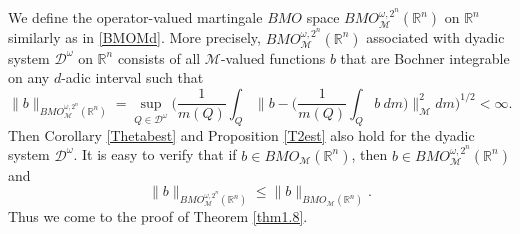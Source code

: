 \documentclass[oneside,english,a4wide]{amsart}
\numberwithin{equation}{section}
\numberwithin{figure}{section}
\theoremstyle{plain}
\theoremstyle{plain}
\theoremstyle{definition}
\theoremstyle{plain}
\theoremstyle{remark}
\theoremstyle{definition}
\theoremstyle{remark}
\theoremstyle{definition}
\newcommand{\M}{{\mathcal M}}
\newcommand{\8}{\infty}
\begin{document}
We define the operator-valued martingale $BMO$ space $BMO^{\omega, 2^n}_\M(\mathbb{R}^n)$ on $\mathbb{R}^n$ similarly as in \eqref{BMOMd}. More precisely, $BMO^{\omega, 2^n}_\M(\mathbb{R}^n)$ associated with dyadic system $\mathcal{ D}^\omega$ on $\mathbb{R}^n$ consists of all $\mathcal{M}$-valued functions $b$ that are Bochner integrable on any $d$-adic interval such that
\begin{equation}\label{BMOMd1}
	\|b\|_{BMO^{\omega, 2^n}_\mathcal{M}(\mathbb{R}^n)}=\sup_{Q\in \mathcal{D}^\omega}\biggl(\frac{1}{m(Q)}\int_Q \biggl\|b-\bigg(\frac{1}{m(Q)} \int_Q b\ d m\bigg)\biggr\|_\mathcal{M}^2 dm\biggr)^{1/2}<\infty.
\end{equation} 
Then Corollary \ref{Thetabest} and Proposition \ref{T2est} also hold for the dyadic system $\mathcal{ D}^\omega$. It is easy to verify that if $b\in BMO_\M(\mathbb{R}^n) $, then $b\in BMO^{\omega, 2^n}_\M(\mathbb{R}^n)$ and
$$ 	\|b\|_{BMO^{\omega, 2^n}_\M(\mathbb{R}^n)}\leq 	\|b\|_{BMO_\M(\mathbb{R}^n)}. $$
Thus we come to the proof of Theorem \ref{thm1.8}.
\end{document}
